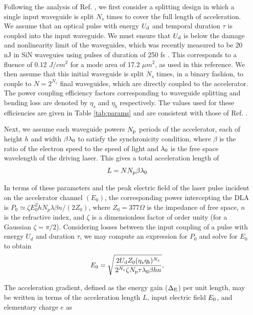 Following the analysis of Ref. \cite{hughes_-chip_2018}, we first consider a splitting design in which a single input waveguide is split $N_s$ times to cover the full length of acceleration.  We assume that an optical pulse with energy $U_\textrm{d}$ and temporal duration $\tau$ is coupled into the input waveguide.  We must ensure that $U_\textrm{d}$ is below the damage and nonlinearity limit of the waveguides, which was recently measured to be 20 nJ in SiN waveguies using pulses of duration of 250 fs \cite{tan2019silicon}.  This corresponds to a fluence of 0.12 $J/cm^2$ for a mode area of 17.2 $\mu m^2$, as used in this reference. We then assume that this initial waveguide is split $N_s$ times, in a binary fashion, to couple to $N = 2^{N_s}$ final waveguides, which are directly coupled to the accelerator. The power coupling efficiency factors corresponding to waveguide splitting and bending loss are denoted by $\eta_s$ and $\eta_b$ respectively. The values used for these efficiencies are given in Table \ref{tab:params} and are consistent with those of Ref. \cite{hughes_-chip_2018}.

Next, we assume each waveguide powers $N_\textrm{p}$ periods of the accelerator, each of height $h$ and width $\beta \lambda_\textrm{0}$ to satisfy the synchronicity condition, where $\beta$ is the ratio of the electron speed to the speed of light and $\lambda_\textrm{0}$ is the free space wavelength of the driving laser.  This gives a total acceleration length of
%
\begin{equation}
    L = N N_\textrm{p} \beta \lambda_\textrm{0}
    \label{eq:L}
\end{equation}

In terms of these parameters and  the peak electric field of the laser pulse incident on the accelerator channel $(E_0)$, the corresponding power intercepting the DLA is $P_0 \simeq \zeta E_0^2 h N_p \lambda \beta n/ (2 Z_0)$, where $Z_0 = 377 \Omega$ is the impedance of free space, $n$ is the refractive index, and $\zeta$ is a dimensionless factor of order unity (for a Gaussian $\zeta = \pi/2$). Considering losses between the input coupling of a pulse with energy $U_d$ and duration $\tau$, we may compute an expression for $P_0$ and solve for $E_0$ to obtain
\begin{equation}
    E_\textrm{0} = \sqrt{\frac{2 U_\textrm{d} Z_0 (\eta_s \eta_b)^{N_s}}{2^{N_s} \zeta N_\textrm{p} \tau \lambda_\textrm{0} \beta h n}},
    \label{eq:E0}
\end{equation}

The acceleration gradient, defined as the energy gain ($\Delta_\textrm{E}$) per unit length, may be written in terms of the acceleration length $L$, input electric field $E_\textrm{0}$, and elementary charge $e$ as

